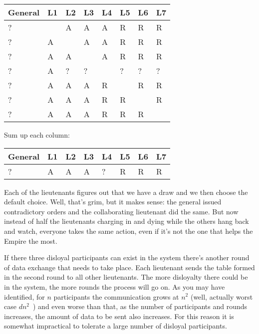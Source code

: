 \begin{center}
	\begin{tabular}{|l|l|l|l|l|l|l|l|}
		\hline
		General & L1 & L2 & L3 & L4 & L5 & L6 & L7 \\
		\hline
		?       & ~  & A  & A  & A  & R  & R  & R  \\ \hline
		?       & A  & ~  & A  & A  & R  & R  & R  \\ \hline
		?       & A  & A  & ~  & A  & R  & R  & R  \\ \hline
		?       & A  & ?  & ?  & ~  & ?  & ?  & ?  \\ \hline
		?       & A  & A  & A  & R  & ~  & R  & R  \\ \hline
		?       & A  & A  & A  & R  & R  & ~  & R  \\ \hline
		?       & A  & A  & A  & R  & R  & R  & ~  \\ \hline
	\end{tabular}
\end{center}

Sum up each column:

\begin{center}
	\begin{tabular}{|l|l|l|l|l|l|l|l|}
		\hline
		General & L1 & L2 & L3 & L4 & L5 & L6 & L7 \\
		\hline
		?       & A  & A  & A  & ?  & R  & R  & R  \\
		\hline
	\end{tabular}
\end{center}

Each of the lieutenants figures out that we have a draw and we then choose the default choice. Well, that's grim, but it makes sense: the general issued contradictory orders and the collaborating lieutenant did the same. But now instead of half the lieutenants charging in and dying while the others hang back and watch, everyone takes the same action, even if it's not the one that helps the Empire the most.

If there three disloyal participants can exist in the system there's another round of data exchange that needs to take place. Each lieutenant sends the table formed in the second round to all other lieutenants. The more disloyalty there could be in the system, the more rounds the process will go on. As you may have identified, for $n$ participants the communication grows at $n^{2}$ (well, actually worst case $dn^{2}$~\cite{mte241}) and even worse than that, as the number of participants and rounds increases, the amount of data to be sent also increases. For this reason it is somewhat impractical to tolerate a large number of disloyal participants.

